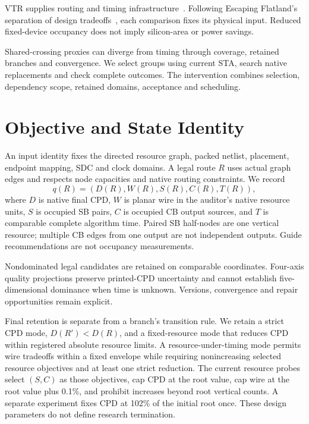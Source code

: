 \documentclass[conference,10pt]{IEEEtran}
\begin{document}
VTR supplies routing and timing infrastructure~\cite{vtr9paper}. Following Escaping Flatland's separation of design tradeoffs~\cite{flatland}, each comparison fixes its physical input. Reduced fixed-device occupancy does not imply silicon-area or power savings.

Shared-crossing proxies can diverge from timing through coverage, retained branches and convergence. We select groups using current STA, search native replacements and check complete outcomes. The intervention combines selection, dependency scope, retained domains, acceptance and scheduling. 

\section{Objective and State Identity}
An input identity fixes the directed resource graph, packed netlist, placement, endpoint mapping, SDC and clock domains. A legal route $R$ uses actual graph edges and respects node capacities and native routing constraints. We record
\begin{equation}
 q(R)=(D(R),W(R),S(R),C(R),T(R)),
\end{equation}
where $D$ is native final CPD, $W$ is planar wire in the auditor's native resource units, $S$ is occupied SB pairs, $C$ is occupied CB output sources, and $T$ is comparable complete algorithm time. Paired SB half-nodes are one vertical resource; multiple CB edges from one output are not independent outputs. Guide recommendations are not occupancy measurements.

Nondominated legal candidates are retained on comparable coordinates. Four-axis quality projections preserve printed-CPD uncertainty and cannot establish five-dimensional dominance when time is unknown. Versions, convergence and repair opportunities remain explicit.

Final retention is separate from a branch's transition rule. We retain a strict CPD mode, $D(R')<D(R)$, and a fixed-resource mode that reduces CPD within registered absolute resource limits. A resource-under-timing mode permits wire tradeoffs within a fixed envelope while requiring nonincreasing selected resource objectives and at least one strict reduction. The current resource probes select $(S,C)$ as those objectives, cap CPD at the root value, cap wire at the root value plus 0.1\%, and prohibit increases beyond root vertical counts. A separate experiment fixes CPD at 102\% of the initial root once. These design parameters do not define research termination.
\end{document}
